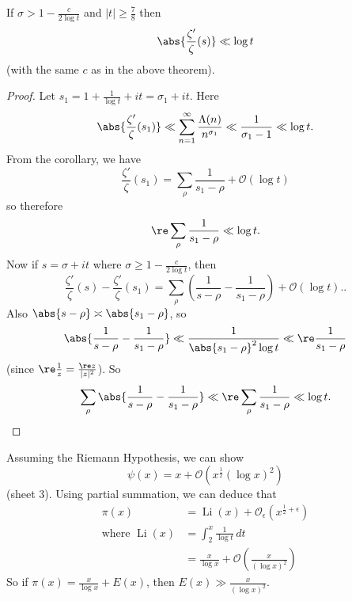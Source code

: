 \documentclass{article}
\newcommand{\1}{\mathbbm{1}}
\newcommand{\bigO}{\mathcal{O}}
\DeclareMathOperator\Li{Li}
\begin{document}
\begin{lemma}
  If $\sigma > 1 - \frac{c}{2 \log t}$ and $|t| \geq \frac{7}{8}$ then
  \begin{align*}
    \abs{\frac{\zeta'}{\zeta}(s)} \ll \log t
  \end{align*}
  (with the same $c$ as in the above theorem).
\end{lemma}
\begin{proof}
  Let $s_1 = 1 + \frac{1}{\log t} + it = \sigma_1 + it$.
  Here
  \begin{align*}
    \abs{\frac{\zeta'}{\zeta}(s_1)} \ll \sum_{n=1}^{\infty} \frac{\Lambda(n)}{n^{\sigma_1}} \ll \frac{1}{\sigma_1-1} \ll \log t.
  \end{align*}
  From the corollary, we have
  \begin{equation*}
    \frac{\zeta'}{\zeta}(s_1) = \sum_\rho \frac{1}{s_1-\rho} + \bigO(\log t)
  \end{equation*}
  so therefore
  \begin{align*}
    \re \sum_\rho \frac{1}{s_1-\rho} \ll \log t.
  \end{align*}
  Now if $s = \sigma+it$ where $\sigma \geq 1 - \frac{c}{2\log t}$, then
  \begin{equation*}
    \frac{\zeta'}{\zeta}(s) - \frac{\zeta'}{\zeta}(s_1) = \sum_\rho \left(\frac{1}{s-\rho} - \frac{1}{s_1-\rho}\right) + \bigO(\log t).
  .\end{equation*}
  Also $\abs{s-\rho} \asymp \abs{s_1-\rho}$, so
  \begin{equation*}
    \abs{\frac{1}{s-\rho}-\frac{1}{s_1-\rho}} \ll \frac{1}{\abs{s_1-\rho}^2 \log t} \ll \re \frac{1}{s_1-\rho}
  \end{equation*}
  (since $\re \frac{1}{z}= \frac{\re z}{|z|^2}$).
  So
  \begin{equation*}
    \sum_\rho \abs{\frac{1}{s-\rho}-\frac{1}{s_1-\rho}} \ll \re \sum_\rho \frac{1}{s_1-\rho} \ll \log t. \qedhere
  \end{equation*}
\end{proof}
Assuming the Riemann Hypothesis, we can show
\begin{equation*}
  \psi(x) = x + \bigO(x^{\frac{1}{2}}(\log x)^2)
\end{equation*}
(sheet 3).
Using partial summation, we can deduce that
\begin{align*}
  \pi(x) &= \Li(x) + \bigO_\epsilon(x^{\frac{1}{2}+\epsilon}) \\
  \text{where } \Li(x) &= \int_2^x \frac{1}{\log t}\,dt \\
                       &= \frac{x}{\log x} + \bigO\left(\frac{x}{(\log x)^2}\right)
\end{align*}
So if $\pi(x) = \frac{x}{\log x}+E(x)$, then $E(x) \gg \frac{x}{(\log x)^2}$.
\end{document}
